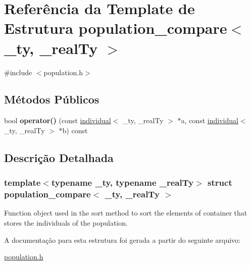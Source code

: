 \hypertarget{structpopulation__compare}{
\section{Referência da Template de Estrutura population\_\-compare$<$ \_\-ty, \_\-realTy $>$}
\label{structpopulation__compare}
}


{\ttfamily \#include $<$population.h$>$}

\subsection*{Métodos Públicos}
\begin{DoxyCompactItemize}
\item 
\hypertarget{structpopulation__compare_aad5bd281f88104395004ee4e62bd0c10}{
bool {\bfseries operator()} (const \hyperlink{classindividual}{individual}$<$ \_\-ty, \_\-realTy $>$ $\ast$a, const \hyperlink{classindividual}{individual}$<$ \_\-ty, \_\-realTy $>$ $\ast$b) const }
\label{structpopulation__compare_aad5bd281f88104395004ee4e62bd0c10}

\end{DoxyCompactItemize}


\subsection{Descrição Detalhada}
\subsubsection*{template$<$typename \_\-ty, typename \_\-realTy$>$ struct population\_\-compare$<$ \_\-ty, \_\-realTy $>$}

Function object used in the sort method to sort the elements of container that stores the individuals of the population. 

A documentação para esta estrutura foi gerada a partir do seguinte arquivo:\begin{DoxyCompactItemize}
\item 
\hyperlink{population_8h}{population.h}\end{DoxyCompactItemize}
